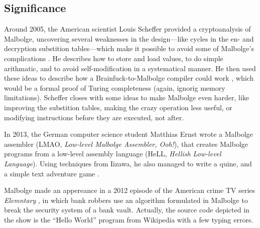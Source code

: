 \subsection{Significance}

Around 2005, the American scientist Louis Scheffer provided a cryptoanalysis of Malbolge, uncovering several weaknesses in the design---like cycles in the en- and decryption substition tables---which make it possible to avoid some of Malbolge's complications \cite{schefferintroduction}. He describes how to store and load values, to do simple arithmatic, and to avoid self-modification in a systematical manner. He then used these ideas to describe how a Brainfuck-to-Malbolge compiler could work \cite{schefferwriting}, which would be a formal proof of Turing completeness (again, ignorig memory limitations). Scheffer closes with some ideas to make Malbolge even harder, like improving the substition tables, making the crazy operation less useful, or modifying instructions before they are executed, not after.

In 2013, the German computer science student Matthias Ernst wrote a Malbolge assembler (LMAO, \emph{Low-level Malbolge Assembler, Ooh!}), that creates Malbolge programs from a low-level assembly language (HeLL, \emph{Hellish Low-level Language}). Using techniques from Iizawa, he also managed to write a quine, and a simple text adventure game \cite{ernstmalbolge}.

Malbolge made an appereance in a 2012 episode of the American crime TV series \emph{Elemntary} \cite{hamilton2012esoteric}, in which bank robbers use an algorithm formulated in Malbolge to break the security system of a bank vault. Actually, the source code depicted in the show is the “Hello World” program from Wikipedia with a few typing errors.
